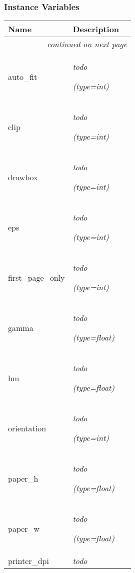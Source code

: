   \subsubsection{Instance Variables}

    \vspace{-1cm}
\hspace{\varindent}\begin{longtable}{|p{\varnamewidth}|p{\vardescrwidth}|l}
\cline{1-2}
\cline{1-2} \centering \textbf{Name} & \centering \textbf{Description}& \\
\cline{1-2}
\endhead\cline{1-2}\multicolumn{3}{r}{\small\textit{continued on next page}}\\\endfoot\cline{1-2}
\endlastfoot\raggedright a\-u\-t\-o\-\_\-f\-i\-t\- & \raggedright \emph{todo}

            {\it (type=int)}&\\
\cline{1-2}
\raggedright c\-l\-i\-p\- & \raggedright \emph{todo}

            {\it (type=int)}&\\
\cline{1-2}
\raggedright d\-r\-a\-w\-b\-o\-x\- & \raggedright \emph{todo}

            {\it (type=int)}&\\
\cline{1-2}
\raggedright e\-p\-s\- & \raggedright \emph{todo}

            {\it (type=int)}&\\
\cline{1-2}
\raggedright f\-i\-r\-s\-t\-\_\-p\-a\-g\-e\-\_\-o\-n\-l\-y\- & \raggedright \emph{todo}

            {\it (type=int)}&\\
\cline{1-2}
\raggedright g\-a\-m\-m\-a\- & \raggedright \emph{todo}

            {\it (type=float)}&\\
\cline{1-2}
\raggedright h\-m\- & \raggedright \emph{todo}

            {\it (type=float)}&\\
\cline{1-2}
\raggedright o\-r\-i\-e\-n\-t\-a\-t\-i\-o\-n\- & \raggedright \emph{todo}

            {\it (type=int)}&\\
\cline{1-2}
\raggedright p\-a\-p\-e\-r\-\_\-h\- & \raggedright \emph{todo}

            {\it (type=float)}&\\
\cline{1-2}
\raggedright p\-a\-p\-e\-r\-\_\-w\- & \raggedright \emph{todo}

            {\it (type=float)}&\\
\cline{1-2}
\raggedright p\-r\-i\-n\-t\-e\-r\-\_\-d\-p\-i\- & \raggedright \emph{todo}


\end{longtable}
